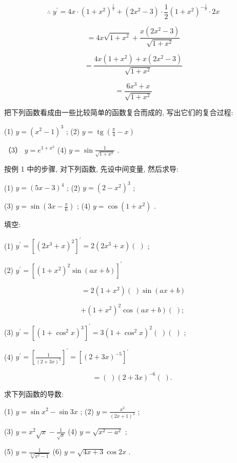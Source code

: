 \documentclass[lang=cn,newtx,10pt,scheme=chinese]{elegantbook}
\begin{document}
\[
\therefore \;{y}^{\prime } = {4x} \cdot {\left( 1 + {x}^{2}\right) }^{\frac{1}{2}} + \left( {2{x}^{2} - 3}\right) \cdot \frac{1}{2}{\left( 1 + {x}^{2}\right) }^{-\frac{1}{2}} \cdot {2x}
\]

\[
= {4x}\sqrt{1 + {x}^{2}} + \frac{x\left( {2{x}^{2} - 3}\right) }{\sqrt{1 + {x}^{2}}}
\]

\[
= \frac{{4x}\left( {1 + {x}^{2}}\right) + x\left( {2{x}^{2} - 3}\right) }{\sqrt{1 + {x}^{2}}}
\]

\[
= \frac{6{x}^{3} + x}{\sqrt{1 + {x}^{2}}}
\]

\begin{problemset}[练习]

\item 把下列函数看成由一些比较简单的函数复合而成的, 写出它们的复合过程:

(1) \(y = {\left( {x}^{2} - 1\right) }^{3}\) ; (2) \(y = \operatorname{tg}\left( {\frac{\pi }{4} - x}\right)\)

（3） \(y = {e}^{1 + {x}^{2}}\) (4) \(y = \sin \frac{1}{\sqrt{1 + {x}^{2}}}\) .

\item 按例 1 中的步骤, 对下列函数, 先设中间变量, 然后求导:

(1) \(y = {\left( 5x - 3\right) }^{4}\) ; (2) \(y = {\left( 2 - {x}^{2}\right) }^{3}\) ;

(3) \(y = \sin \left( {{3x} - \frac{\pi }{6}}\right)\) ; (4) \(y = \cos \left( {1 + {x}^{2}}\right)\) .

\item 填空:

(1) \({y}^{\prime } = {\left\lbrack {\left( 2{x}^{3} + x\right) }^{2}\right\rbrack }^{\prime } = 2\left( {2{x}^{3} + x}\right) \left( \;\right)\) ;

(2) \({y}^{\prime } = {\left\lbrack {\left( 1 + {x}^{2}\right) }^{2}\sin \left( ax + b\right) \right\rbrack }^{\prime }\)

\[
= 2\left( {1 + {x}^{2}}\right) \left( \;\right) \sin \left( {{ax} + b}\right)
\]

\[
+ {\left( 1 + {x}^{2}\right) }^{2}\cos \left( {{ax} + b}\right) \left( \;\right) \text{; }
\]

(3) \({y}^{\prime } = {\left\lbrack {\left( 1 + {\cos }^{2}x\right) }^{3}\right\rbrack }^{\prime } = 3{\left( 1 + {\cos }^{2}x\right) }^{2}\left( \;\right) \left( \;\right)\) ;

(4) \({y}^{\prime } = {\left\lbrack \frac{1}{{\left( 2 + 3x\right) }^{5}}\right\rbrack }^{\prime } = {\left\lbrack {\left( 2 + 3x\right) }^{-5}\right\rbrack }^{\prime }\)

\[
= \left( \;\right) {\left( 2 + 3x\right) }^{-6}\left( \;\right) \text{. }
\]

\item 求下列函数的导数:

(1) \(y = \sin {x}^{2} - \sin {3x}\) ; (2) \(y = \frac{{x}^{2}}{{\left( 2x + 1\right) }^{3}}\) ;

(3) \(y = {x}^{2}\sqrt{x} - \frac{1}{\sqrt{x}}\) (4) \(y = \sqrt{{x}^{2} - {a}^{2}}\) ;

(5) \(y = \frac{1}{\sqrt[3]{{x}^{2} - 1}}\) (6) \(y = \sqrt{{4x} + 3}\cos {2x}\) .
\end{problemset}
\end{document}
